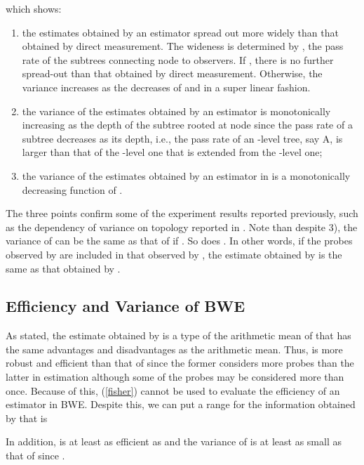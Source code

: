 \documentclass[10pt,onecolumn]{IEEEtran}
\begin{document}
which shows:
\begin{enumerate}
 \item the estimates obtained by an estimator spread out more widely than that obtained by direct measurement. The wideness is determined by , the pass rate of the subtrees connecting node  to observers. If , there is no further spread-out than that obtained by direct measurement. Otherwise, the variance increases as the decreases of  and in a super linear fashion.
\item
the variance of the estimates obtained by an estimator is monotonically increasing as the depth of the subtree rooted at node  since the pass rate of a subtree decreases as its depth, i.e., the pass rate of an -level tree, say A, is larger than that of the -level one that is extended from the -level one;
\item the variance of the estimates  obtained by an estimator in  is a monotonically decreasing function of . 
\end{enumerate}
The three points confirm some of the experiment results reported previously, such as the dependency of variance on topology reported in \cite{CDHT99}. Note than despite 3), the variance of  can be the same as that of  if . So does . In other words, if the probes observed by  are included in that observed by , the estimate obtained by  is the same as that obtained by .



\subsection{Efficiency and Variance of BWE}

As stated, the estimate obtained by  is a type of the arithmetic mean of  that has the same advantages and disadvantages as the arithmetic mean. Thus,  is more robust and efficient than that of  since the former considers more probes than the latter in estimation although some of the probes may be considered more than once. Because of this, (\ref{fisher}) cannot be used to evaluate the efficiency of an estimator in BWE. Despite this, we can put a range for the information obtained by  that is
 
In addition,  is at least as efficient as  and the variance of  is at least as small as that of  since .
\end{document}
